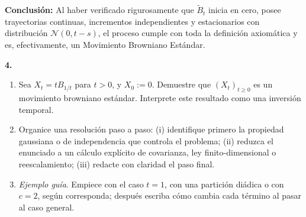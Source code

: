 \documentclass[11pt, letterpaper]{article}
\begin{document}
\begin{solucion}
    \textbf{Conclusión:} Al haber verificado rigurosamente que $\tilde{B}_t$ inicia en cero, posee trayectorias continuas, incrementos independientes y estacionarios con distribución $\mathcal{N}(0, t-s)$, el proceso cumple con toda la definición axiomática y es, efectivamente, un Movimiento Browniano Estándar.
\end{solucion}

\newpage

\begin{ejercicio}
    \textbf{4.} 
    \begin{enumerate}
        \item Sea $X_t = tB_{1/t}$ para $t > 0$, y $X_0 := 0$. Demuestre que $(X_t)_{t\ge 0}$ es un movimiento browniano estándar. Interprete este resultado como una inversión temporal.
        \item Organice una resolución paso a paso: (i) identifique primero la propiedad gaussiana o de independencia que controla el problema; (ii) reduzca el enunciado a un cálculo explícito de covarianza, ley finito-dimensional o reescalamiento; (iii) redacte con claridad el paso final.
        \item \textit{Ejemplo guía}. Empiece con el caso $t = 1$, con una partición diádica o con $c = 2$, según corresponda; después escriba cómo cambia cada término al pasar al caso general.
    \end{enumerate}
\end{ejercicio}

\vspace{5mm}
\end{document}

